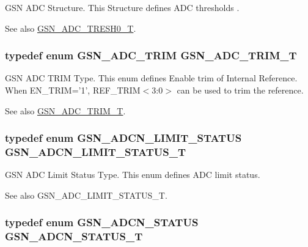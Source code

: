 GSN ADC Structure. This Structure defines ADC thresholds . 

\begin{DoxySeeAlso}{See also}
\hyperlink{a00643_ga67dc995f7880016f896f0fdf6b61309b}{GSN\_\-ADC\_\-TRESH0\_\-T}. 
\end{DoxySeeAlso}
\hypertarget{a00643_gace83cba6b68fe265f09d30cda1ef0e63}{
\subsubsection[{GSN\_\-ADC\_\-TRIM\_\-T}]{\setlength{\rightskip}{0pt plus 5cm}typedef enum {\bf GSN\_\-ADC\_\-TRIM}  {\bf GSN\_\-ADC\_\-TRIM\_\-T}}}
\label{a00643_gace83cba6b68fe265f09d30cda1ef0e63}


GSN ADC TRIM Type. This enum defines Enable trim of Internal Reference. When EN\_\-TRIM='1', REF\_\-TRIM$<$3:0$>$ can be used to trim the reference. 

\begin{DoxySeeAlso}{See also}
\hyperlink{a00643_gace83cba6b68fe265f09d30cda1ef0e63}{GSN\_\-ADC\_\-TRIM\_\-T}. 
\end{DoxySeeAlso}
\hypertarget{a00643_gadcd568439f5ada07d7d96a582f37096f}{
\subsubsection[{GSN\_\-ADCN\_\-LIMIT\_\-STATUS\_\-T}]{\setlength{\rightskip}{0pt plus 5cm}typedef enum {\bf GSN\_\-ADCN\_\-LIMIT\_\-STATUS} {\bf GSN\_\-ADCN\_\-LIMIT\_\-STATUS\_\-T}}}
\label{a00643_gadcd568439f5ada07d7d96a582f37096f}


GSN ADC Limit Status Type. This enum defines ADC limit status. 

\begin{DoxySeeAlso}{See also}
GSN\_\-ADC\_\-LIMIT\_\-STATUS\_\-T. 
\end{DoxySeeAlso}
\hypertarget{a00643_gac8232626400d1264d361acee029bc36f}{
\subsubsection[{GSN\_\-ADCN\_\-STATUS\_\-T}]{\setlength{\rightskip}{0pt plus 5cm}typedef enum {\bf GSN\_\-ADCN\_\-STATUS}  {\bf GSN\_\-ADCN\_\-STATUS\_\-T}}}
\label{a00643_gac8232626400d1264d361acee029bc36f}



